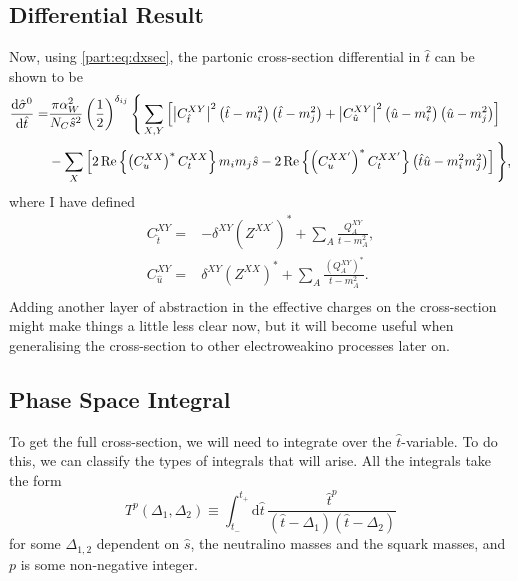 \documentclass[../main.tex]{subfiles}
\begin{document}
\subsection{Differential Result}
Now, using \cref{part:eq:dxsec}, the partonic cross-section differential in \(\hat{t}\) can be shown to be
\begin{align}
  \nonumber
  \d[\hat{t}]{\hat{\sigma}^0} = & \frac{\pi \alpha_W^2}{N_C \hat{s}^2}
  \pclosed{\frac{1}{2}}^{\delta_{ij}} \Bigg\{ \sum_{X,Y}
  \bclosed{\abs{C^{XY}_{\hat{t}}}^2
    \pclosed{\hat{t}-m_i^2}\pclosed{\hat{t}-m_j^2} +
    \abs{C^{XY}_{\hat{u}}}^2
  \pclosed{\hat{u}-m_i^2}\pclosed{\hat{u}-m_j^2}}                      \\
                                & - \sum_X
  \bclosed{2\Re{\pclosed{C_{u}^{XX}}^\ast C_{t}^{XX}} m_i m_j \hat{s} -
    2\Re{\pclosed{C_{u}^{XX^\prime}}^\ast C_{t}^{XX^\prime}}
    \pclosed{\hat{t}\hat{u} - m_i^2m_j^2}} \Bigg\},
\end{align}
where I have defined
\begin{subequations}
  \begin{align}
    C_{\hat{t}}^{XY} = & -\delta^{XY} (Z^{XX^\prime})^\ast + \sum_{A}\frac{Q_A^{XY}}{t-m_A^2}, \\
    C_{\hat{u}}^{XY} = & \delta^{XY} (Z^{XX})^\ast + \sum_{A}\frac{(Q_A^{XY})^\ast}{t-m_A^2}.  \\
  \end{align}
\end{subequations}
Adding another layer of abstraction in the effective charges on the cross-section might make things a little less clear now, but it will become useful when generalising the cross-section to other electroweakino processes later on.


\subsection{Phase Space Integral}
To get the full cross-section, we will need to integrate over the \(\hat{t}\)-variable.
To do this, we can classify the types of integrals that will arise.
All the integrals take the form
\begin{equation}
  T^p(\Delta_1, \Delta_2) \equiv \int_{t_-}^{t_+} \!\mathrm{d}\hat{t}\,
  \frac{\hat{t}^p}{(\hat{t}-\Delta_1)(\hat{t}-\Delta_2)}
\end{equation}
for some \(\Delta_{1,2}\) dependent on \(\hat{s}\), the neutralino masses and
the squark masses, and \(p\) is some non-negative integer.
\end{document}
